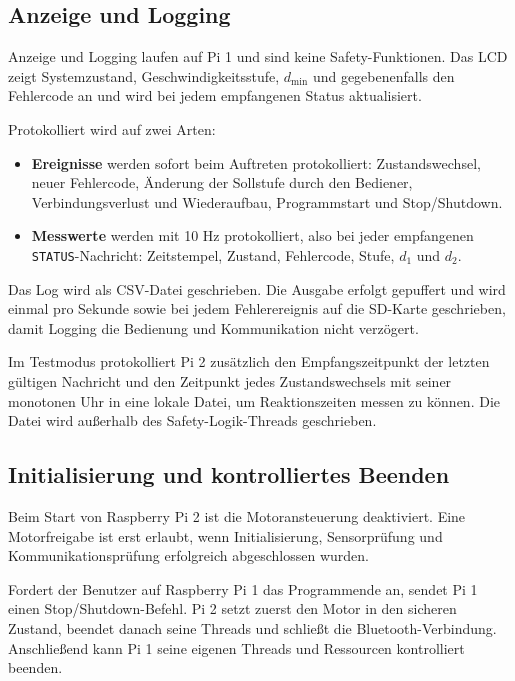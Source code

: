 \subsection{Anzeige und Logging}
\label{sec:logging}

Anzeige und Logging laufen auf Pi 1 und sind keine Safety-Funktionen. Das LCD
zeigt Systemzustand, Geschwindigkeitsstufe, $d_{\min}$ und gegebenenfalls den
Fehlercode an und wird bei jedem empfangenen Status aktualisiert.

Protokolliert wird auf zwei Arten:

\begin{itemize}
    \item \textbf{Ereignisse} werden sofort beim Auftreten protokolliert: Zustandswechsel, neuer Fehlercode, Änderung der Sollstufe durch den Bediener, Verbindungsverlust und Wiederaufbau, Programmstart und Stop/Shutdown.
    \item \textbf{Messwerte} werden mit 10 Hz protokolliert, also bei jeder empfangenen \texttt{STATUS}-Nachricht: Zeitstempel, Zustand, Fehlercode, Stufe, $d_1$ und $d_2$.
\end{itemize}

Das Log wird als CSV-Datei geschrieben. Die Ausgabe erfolgt gepuffert und wird
einmal pro Sekunde sowie bei jedem Fehlerereignis auf die SD-Karte
geschrieben, damit Logging die Bedienung und Kommunikation nicht verzögert.

Im Testmodus protokolliert Pi 2 zusätzlich den Empfangszeitpunkt der letzten
gültigen Nachricht und den Zeitpunkt jedes Zustandswechsels mit seiner monotonen
Uhr in eine lokale Datei, um Reaktionszeiten messen zu können. Die Datei wird
außerhalb des Safety-Logik-Threads geschrieben.

\subsection{Initialisierung und kontrolliertes Beenden}

Beim Start von Raspberry Pi 2 ist die Motoransteuerung deaktiviert. Eine
Motorfreigabe ist erst erlaubt, wenn Initialisierung, Sensorprüfung und
Kommunikationsprüfung erfolgreich abgeschlossen wurden.

Fordert der Benutzer auf Raspberry Pi 1 das Programmende an, sendet Pi 1 einen
Stop/Shutdown-Befehl. Pi 2 setzt zuerst den Motor in den sicheren Zustand,
beendet danach seine Threads und schließt die Bluetooth-Verbindung. Anschließend
kann Pi 1 seine eigenen Threads und Ressourcen kontrolliert beenden.

